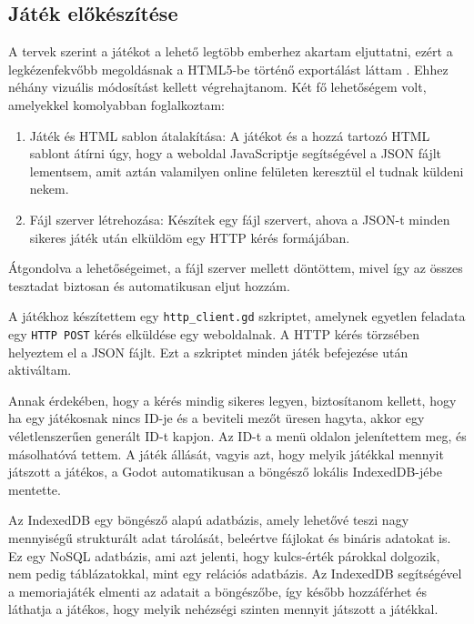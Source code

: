 \subsection{Játék előkészítése}
A tervek szerint a játékot a lehető legtöbb emberhez akartam eljuttatni, ezért a legkézenfekvőbb megoldásnak a HTML5-be történő exportálást láttam \cite{Exportin97:online}. Ehhez néhány vizuális módosítást kellett végrehajtanom.
Két fő lehetőségem volt, amelyekkel komolyabban foglalkoztam:
\begin{enumerate}
    \item  Játék és HTML sablon átalakítása: A játékot és a hozzá tartozó HTML sablont átírni úgy, hogy a weboldal JavaScriptje segítségével a JSON fájlt lementsem, amit aztán valamilyen online felületen keresztül el tudnak küldeni nekem.
    \item	Fájl szerver létrehozása: Készítek egy fájl szervert, ahova a JSON-t minden sikeres játék után elküldöm egy HTTP kérés formájában.

\end{enumerate}


Átgondolva a lehetőségeimet, a fájl szerver mellett döntöttem, mivel így az összes tesztadat biztosan és automatikusan eljut hozzám.

A játékhoz készítettem egy \lstinline{http_client.gd} szkriptet, amelynek egyetlen feladata egy \lstinline{HTTP POST} kérés elküldése egy weboldalnak. A HTTP kérés törzsében helyeztem el a JSON fájlt. Ezt a szkriptet minden játék befejezése után aktiváltam.

Annak érdekében, hogy a kérés mindig sikeres legyen, biztosítanom kellett, 
hogy ha egy játékosnak nincs ID-je és a beviteli mezőt üresen hagyta, akkor egy véletlenszerűen generált ID-t kapjon. 
Az ID-t a menü oldalon jelenítettem meg, és másolhatóvá tettem.
A játék állását, vagyis azt, hogy melyik játékkal mennyit játszott a játékos, a Godot automatikusan a böngésző lokális IndexedDB-jébe \cite{Exportin97:online} mentette.

Az IndexedDB \cite{UsingInd44:online} egy böngésző alapú adatbázis, amely lehetővé teszi nagy mennyiségű strukturált adat tárolását, beleértve fájlokat és bináris adatokat is. Ez egy NoSQL adatbázis, ami azt jelenti, hogy kulcs-érték párokkal dolgozik, nem pedig táblázatokkal, mint egy relációs adatbázis. 
Az IndexedDB segítségével a memoriajáték elmenti az adatait a böngészőbe, így később hozzáférhet és láthatja a játékos, hogy melyik nehézségi szinten mennyit játszott a játékkal.

